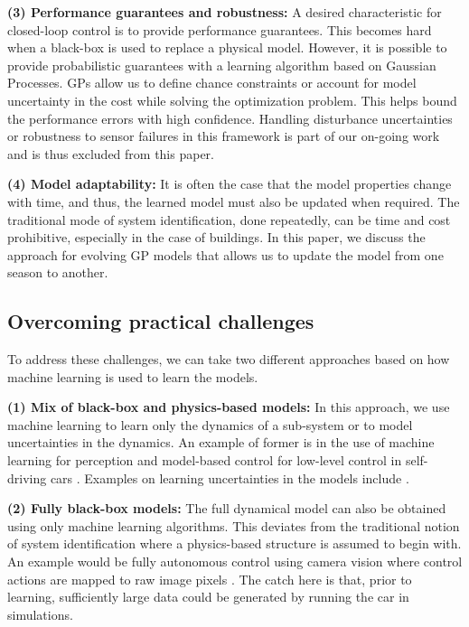 \noindent \textbf{(3) Performance guarantees and robustness:} A desired characteristic for closed-loop control is to provide performance guarantees. This becomes hard when a black-box is used to replace a physical model. However, it is possible to provide probabilistic guarantees with a learning algorithm based on Gaussian Processes. GPs allow us to define chance constraints or account for model uncertainty in the cost while solving the optimization problem. This helps bound the performance errors with high confidence. Handling disturbance uncertainties or robustness to sensor failures in this framework is part of our on-going work and is thus excluded from this paper.

\noindent \textbf{(4) Model adaptability:} It is often the case that the model properties change with time, and thus, the learned model must also be updated when required. The traditional mode of system identification, done repeatedly, can be time and cost prohibitive, especially in the case of buildings. In this paper, we discuss the approach for evolving GP models that allows us to update the model from one season to another.


\subsection{Overcoming practical challenges}
To address these challenges, we can take two different approaches based on how machine learning is used to learn the models.

\noindent \textbf{(1) Mix of black-box and physics-based models:} In this approach, we use machine learning to learn only the dynamics of a sub-system or to model uncertainties in the dynamics. An example of former is in the use of machine learning for perception and model-based control for low-level control in self-driving cars \cite{Urmson2008}. Examples on learning uncertainties in the models include \cite{Berkenkamp2015,Desaraju2016}.

\noindent \textbf{(2) Fully black-box models:} The full dynamical model can also be obtained using only machine learning algorithms. This deviates from the traditional notion of system identification where a physics-based structure is assumed to begin with. An example would be fully autonomous control using camera vision where control actions are mapped to raw image pixels \cite{Bojarski2016}. The catch here is that, prior to learning, sufficiently large data could be generated by running the car in simulations.

